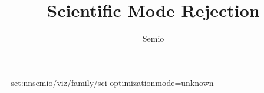 \documentclass[type=paper,language=de,theme=dark]{semio}
\title{Scientific Mode Rejection}
\author{Semio}
\date{}
\begin{document}
\SemioVizProbePage
\ExplSyntaxOn\keys_set:nn{semio/viz/family/sci-optimization}{mode=unknown}\ExplSyntaxOff
{}
\SemioVizProbeEnd
\end{document}
